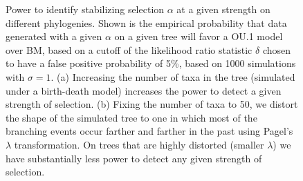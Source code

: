 \begin{figure}
\begin{center}
\end{center}
\caption{
Power to identify stabilizing selection $\alpha$ at a given strength on different phylogenies.  
Shown is the empirical probability that data generated with a given $\alpha$ on a given tree 
will favor a OU.1 model over BM, 
based on a cutoff of the likelihood ratio statistic $\delta$ chosen 
to have a false positive probability of 5\%,
based on 1000 simulations with $\sigma=1$.
(a) Increasing the number of taxa in the tree (simulated under a birth-death model) increases the power to detect a given strength of selection.  
(b) Fixing the number of taxa to 50, we distort the shape of the simulated tree to one in which most of the branching events occur farther and farther in the past using Pagel's $\lambda$ transformation.  On trees that are highly distorted (smaller $\lambda$) we have substantially less power to detect any given strength of selection.  
}
\label{fig:power}
\end{figure}


